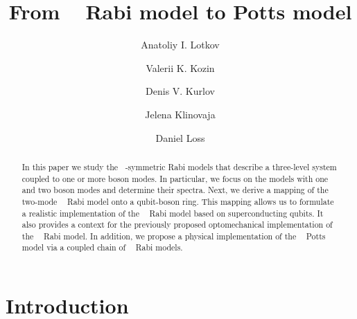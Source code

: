 \documentclass[reprint, aps, prx, amsmath, amssymb, longbibliography, superscriptaddress]{revtex4-2}
\DeclareMathOperator{\Zthree}{\mathbb{Z}_3}
\begin{document}
\title{From \texorpdfstring{$\Zthree$}{Z3} Rabi model to Potts model}

\author{Anatoliy I. Lotkov}

\author{Valerii K. Kozin}


\author{Denis V. Kurlov}


\author{Jelena Klinovaja}

\author{Daniel Loss}



\begin{abstract}

In this paper we study the $\Zthree$-symmetric Rabi models that describe a three-level system coupled to one or more boson modes. In particular, we focus on the models with one and two boson modes and determine their spectra. Next, we derive a mapping of the two-mode $\Zthree$ Rabi model onto a qubit-boson ring. This mapping allows us to formulate a realistic implementation of the $\Zthree$ Rabi model based on superconducting qubits. It also provides a context for the previously proposed optomechanical implementation of the $\Zthree$ Rabi model. In addition, we propose a physical implementation of the $\Zthree$ Potts model via a coupled chain of $\Zthree$ Rabi models.
\end{abstract}

\maketitle


\section{Introduction}
\end{document}
